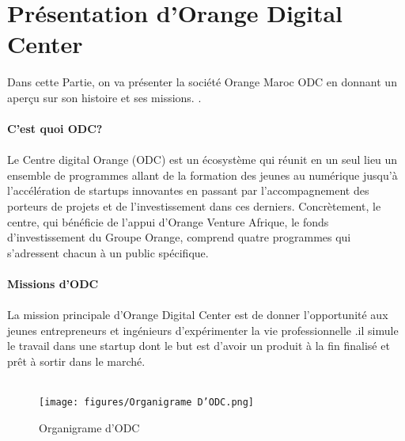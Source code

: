 \chapter*{Présentation d’Orange Digital Center}

\large {Dans cette Partie, on va présenter la société Orange Maroc ODC en donnant un aperçu sur son histoire et ses missions. .\\\\
}
\hspace{0.5cm} \textbf{C’est quoi ODC?}\\\\
\large {Le Centre digital Orange (ODC) est un écosystème qui réunit en un seul lieu un ensemble de programmes allant de la formation des jeunes au numérique jusqu’à l’accélération de startups innovantes en passant par l’accompagnement des porteurs de projets et de l’investissement dans ces derniers. Concrètement, le centre, qui bénéficie de l’appui d’Orange Venture Afrique, le fonds d’investissement du Groupe Orange, comprend quatre programmes qui s’adressent chacun à un public spécifique.
\\\\
}
\hspace{0.5cm} \textbf{Missions d’ODC}\\\\
\large {La mission principale d’Orange Digital Center est de donner l’opportunité aux  jeunes entrepreneurs et ingénieurs d’expérimenter la vie professionnelle .il simule le travail dans une startup dont le but est d’avoir un produit à la fin finalisé et prêt à sortir dans le marché.
\\\\
}
\begin{figure}[!htb] 
\begin{center} 
\texttt{[image: figures/Organigrame D'ODC.png]} \end{center} 
\caption{Organigrame d'ODC} 
\end{figure} 

